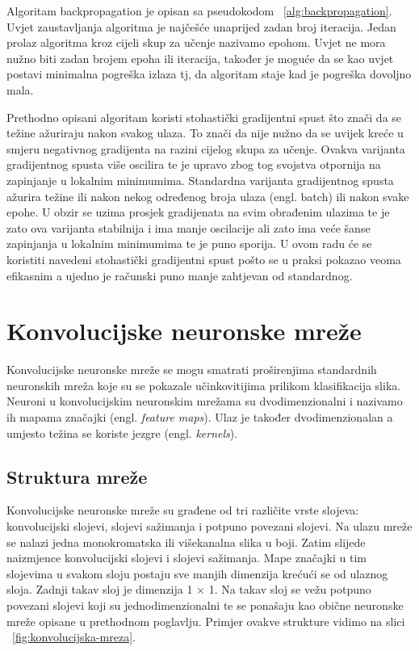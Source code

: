 \documentclass[times, utf8, zavrsni, numeric]{fer}
\begin{document}
Algoritam backpropagation je opisan sa pseudokodom ~\ref{alg:backpropagation}. Uvjet zaustavljanja algoritma je najčešće unaprijed zadan broj iteracija. Jedan prolaz algoritma kroz cijeli skup za učenje nazivamo epohom. Uvjet ne mora nužno biti zadan brojem epoha ili iteracija, također je moguće da se kao uvjet postavi minimalna pogreška izlaza tj, da algoritam staje kad je pogreška dovoljno mala.

Prethodno opisani algoritam koristi stohastički gradijentni spust što znači da se težine ažuriraju nakon svakog ulaza. To znači da nije nužno da se uvijek kreće u smjeru negativnog gradijenta na razini cijelog skupa za učenje. Ovakva varijanta gradijentnog spusta više oscilira te je upravo zbog tog svojstva otpornija na zapinjanje u lokalnim minimumima. Standardna varijanta gradijentnog spusta ažurira težine ili nakon nekog određenog broja ulaza (engl. batch) ili nakon svake epohe. U obzir se uzima prosjek gradijenata na svim obrađenim ulazima te je zato ova varijanta stabilnija i ima manje oscilacije ali zato ima veće šanse zapinjanja u lokalnim minimumima te je puno sporija. U ovom radu će se koristiti navedeni stohastički gradijentni spust pošto se u praksi pokazao veoma efikasnim a ujedno je računski puno manje zahtjevan od standardnog.

\chapter{Konvolucijske neuronske mreže}
Konvolucijske neuronske mreže se mogu smatrati proširenjima standardnih neuronskih mreža koje su se pokazale učinkovitijima prilikom klasifikacija slika. Neuroni u konvolucijskim neuronskim mrežama su dvodimenzionalni i nazivamo ih mapama značajki (engl. \textit{feature maps}). Ulaz je također dvodimenzionalan a umjesto težina se koriste jezgre (engl. \textit{kernels}).

\section{Struktura mreže}
Konvolucijske neuronske mreže su građene od tri različite vrste slojeva: konvolucijski slojevi, slojevi sažimanja i potpuno povezani slojevi. Na ulazu mreže se nalazi jedna monokromatska ili višekanalna slika u boji. Zatim slijede naizmjence konvolucijski slojevi i slojevi sažimanja. Mape značajki u tim slojevima u svakom sloju postaju sve manjih dimenzija krećući se od ulaznog sloja. Zadnji takav sloj je dimenzija 1 $\times$ 1. Na takav sloj se vežu potpuno povezani slojevi koji su jednodimenzionalni te se ponašaju kao obične neuronske mreže opisane u prethodnom poglavlju. Primjer ovakve strukture vidimo na slici ~\ref{fig:konvolucijska-mreza}.
\end{document}
